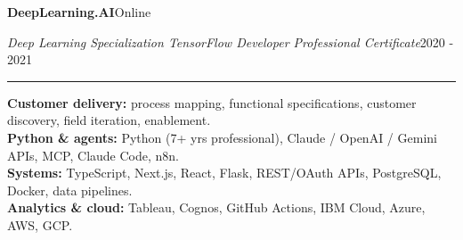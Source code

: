 \documentclass[10pt,letterpaper]{article}
\newcommand{\cvsection}[1]{%
  \vspace{7pt}%
  \noindent{\bfseries\fontsize{11pt}{13pt}\selectfont\MakeUppercase{#1}}\par
  \vspace{1pt}%
  \noindent\rule{\textwidth}{0.4pt}\par
  \vspace{4pt}%
}
\newcommand{\cveduhead}[4]{%
  \noindent\textbf{#1}\hfill#2\par
  \vspace{0.5pt}%
  \noindent\textit{#3}\hfill#4\par
}
\begin{document}
\vspace{3pt}
\cveduhead{DeepLearning.AI}{Online}
{Deep Learning Specialization \textbar{} TensorFlow Developer Professional Certificate}{2020 - 2021}

\cvsection{Skills}

{\raggedright
\noindent\textbf{Customer delivery:} process mapping, functional specifications, customer discovery, field iteration, enablement.\\[2pt]
\noindent\textbf{Python \& agents:} Python (7+ yrs professional), Claude / OpenAI / Gemini APIs, MCP, Claude Code, n8n.\\[2pt]
\noindent\textbf{Systems:} TypeScript, Next.js, React, Flask, REST/OAuth APIs, PostgreSQL, Docker, data pipelines.\\[2pt]
\noindent\textbf{Analytics \& cloud:} Tableau, Cognos, GitHub Actions, IBM Cloud, Azure, AWS, GCP.\par
}
\end{document}
